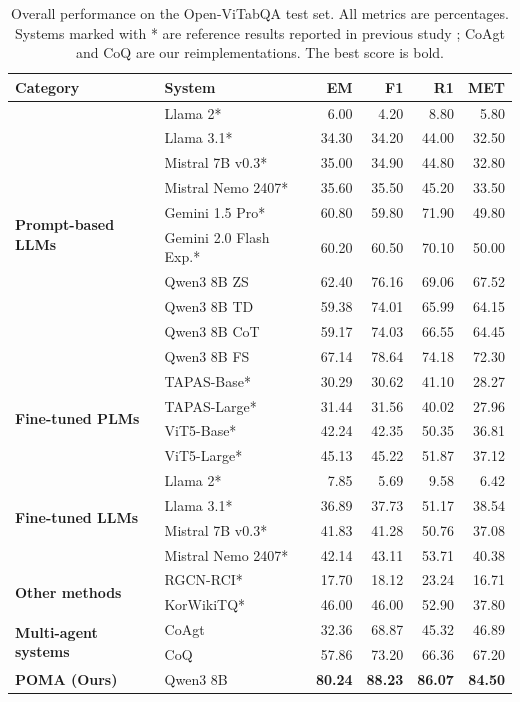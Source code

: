 \documentclass[]{interact}
\begin{document}
\begin{table}[!t]
\small
\caption{Overall performance on the Open-ViTabQA test set. All metrics are percentages. Systems marked with * are reference results reported in previous study \citep{openvitabqa2025}; CoAgt and CoQ are our reimplementations. The best score is bold.}
\label{tab:overall-results}
\begin{tabular*}{\textwidth}{@{\extracolsep{\fill}}p{}p{}rrrr}
\toprule
\textbf{Category} & \textbf{System} & \textbf{EM} & \textbf{F1} & \textbf{R1} & \textbf{MET} \\
\midrule
\multirow{10}{=}{\raggedright\textbf{Prompt-based LLMs}}
& Llama 2* & 6.00 & 4.20 & 8.80 & 5.80 \\
& Llama 3.1* & 34.30 & 34.20 & 44.00 & 32.50 \\
& Mistral 7B v0.3* & 35.00 & 34.90 & 44.80 & 32.80 \\
& Mistral Nemo 2407* & 35.60 & 35.50 & 45.20 & 33.50 \\
& Gemini 1.5 Pro* & 60.80 & 59.80 & 71.90 & 49.80 \\
& Gemini 2.0 Flash Exp.* & 60.20 & 60.50 & 70.10 & 50.00 \\
& Qwen3 8B ZS & 62.40 & 76.16 & 69.06 & 67.52 \\
& Qwen3 8B TD & 59.38 & 74.01 & 65.99 & 64.15 \\
& Qwen3 8B CoT & 59.17 & 74.03 & 66.55 & 64.45 \\
& Qwen3 8B FS & 67.14 & 78.64 & 74.18 & 72.30 \\
\midrule
\multirow{4}{=}{\raggedright\textbf{Fine-tuned PLMs}}
& TAPAS-Base* & 30.29 & 30.62 & 41.10 & 28.27 \\
& TAPAS-Large* & 31.44 & 31.56 & 40.02 & 27.96 \\
& ViT5-Base* & 42.24 & 42.35 & 50.35 & 36.81 \\
& ViT5-Large* & 45.13 & 45.22 & 51.87 & 37.12 \\
\midrule
\multirow{4}{=}{\raggedright\textbf{Fine-tuned LLMs}}
& Llama 2* & 7.85 & 5.69 & 9.58 & 6.42 \\
& Llama 3.1* & 36.89 & 37.73 & 51.17 & 38.54 \\
& Mistral 7B v0.3* & 41.83 & 41.28 & 50.76 & 37.08 \\
& Mistral Nemo 2407* & 42.14 & 43.11 & 53.71 & 40.38 \\
\midrule
\multirow{2}{=}{\raggedright\textbf{Other methods}}
& RGCN-RCI* & 17.70 & 18.12 & 23.24 & 16.71 \\
& KorWikiTQ* & 46.00 & 46.00 & 52.90 & 37.80 \\
\midrule
\multirow{2}{=}{\raggedright\textbf{Multi-agent systems}}
& CoAgt & 32.36 & 68.87 & 45.32 & 46.89 \\
& CoQ & 57.86 & 73.20 & 66.36 & 67.20 \\
\midrule
\textbf{POMA (Ours)}
& Qwen3 8B & \textbf{80.24} & \textbf{88.23} & \textbf{86.07} & \textbf{84.50} \\
\bottomrule
\end{tabular*}
\end{table}
\end{document}
